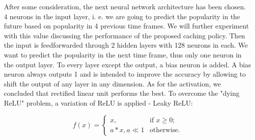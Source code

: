 After some consideration, the next neural network architecture has been chosen. 4 neurons in the input layer, i. e. we are going to predict the popularity in the future based on popularity in 4 previous time frames. We will further experiment with this value discussing the performance of the proposed caching policy. Then the input is feedforwarded through 2 hidden layers with 128 neurons in each. We want to predict the popularity in the next time frame, thus only one neuron in the output layer. To every layer except the output, a bias neuron is added. A bias neuron always outputs 1 and is intended to improve the accuracy by allowing to shift the output of any layer in any dimension. As for the activation, we concluded that rectified linear unit performs the best. To overcome the "dying ReLU"\cite{14} problem, a variation of ReLU is applied - Leaky ReLU:

$$ f(x) = 
	\begin{cases}
	x, & \text{if } x \geq 0; \\
	a*x, a \ll 1 & \text{otherwise.}
	\end{cases}
$$


